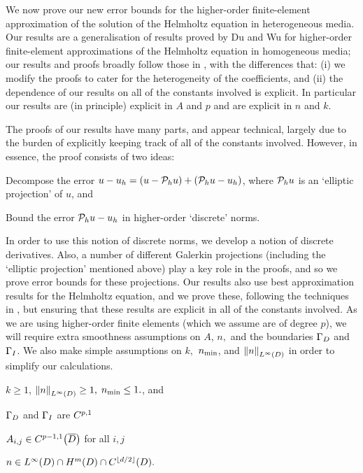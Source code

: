 We now prove our new error bounds for the higher-order finite-element approximation of the solution of the Helmholtz equation in heterogeneous media. Our results are a generalisation of results proved by Du and Wu \cite{DuWu:15} for higher-order finite-element approximations of the Helmholtz equation in homogeneous media; our results and proofs broadly follow those in \cite{DuWu:15}, with the differences that: (i) we modify the proofs to cater for the heterogeneity of the coefficients, and (ii) the dependence of our results on all of the constants involved is explicit. In particular our results are (in principle) explicit in $A$  and $p$ and are explicit in $n$ and $k$.

The proofs of our results have many parts, and appear technical, largely due to the burden of explicitly keeping track of all of the constants involved. However, in essence, the proof consists of two ideas:
\ben
\item Decompose the error $u-u_{h} = (u - \mathcal P_{h} u) + (\mathcal P_{h} u - u_{h})$, where $\mathcal P_{h} u$ is an `elliptic projection' of $u$, and
\item Bound the error $\mathcal P_{h} u - u_{h}$ in higher-order `discrete' norms.
\een

In order to use this notion of discrete norms, we develop a notion of discrete derivatives. Also, a number of different Galerkin projections (including the `elliptic projection' mentioned above) play a key role in the proofs, and so we prove error bounds for these projections. Our results also use best approximation results for the Helmholtz equation, and we prove these, following the techniques in \cite{ChNi:18a}, but ensuring that these results are explicit in all of the constants involved.
As we are using higher-order finite elements (which we assume are of degree $p$), we will require extra smoothness assumptions on $A$, $n,$ and the boundaries $\Gamma_{D}$ and $\Gamma_{I}$. We also make simple assumptions on $k,$ $n_{\min}$, and $\NLiD{n}$ in order to simplify our calculations.

\label{ass:highp}
$k \geq 1$, $\NLiD{n} \geq 1,$ $n_{\min} \leq 1.$, and
\bit
\item $\Gamma_{D}$ and $\Gamma_{I}$ are $C^{p,1}$
\item $\Aij \in \CpmooDclos$ for all $i,j$
\item $n \in \LiD \cap \HmD \cap \CfloordtD.$
  \eit
\eas

